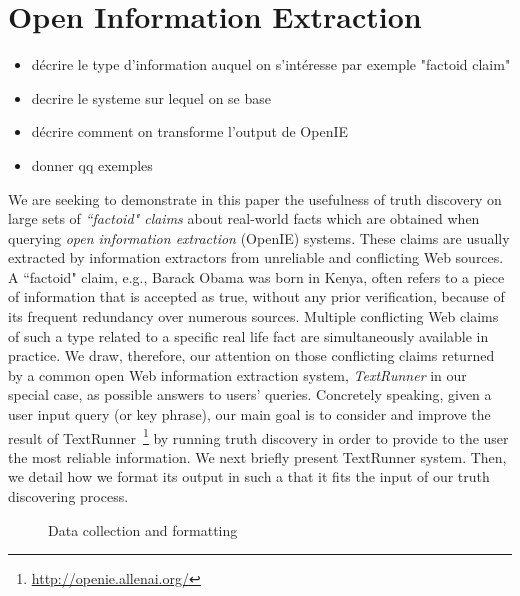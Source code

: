 \section{Open Information Extraction}
\begin{itemize}
 \item décrire le type d'information auquel on s'intéresse par exemple "factoid claim"
 \item decrire le systeme sur lequel on se base
 \item décrire comment on transforme l'output de OpenIE
 \item donner qq exemples
\end{itemize}

\medskip

We are seeking to demonstrate in this paper the usefulness of truth discovery on large sets of 
\emph{``factoid" claims} about real-world facts which are obtained when querying \emph{open information
extraction} (OpenIE) systems. These claims are usually extracted by information extractors from unreliable
and conflicting Web sources.
A ``factoid" claim, e.g.,  \textsf{Barack Obama was born in Kenya}, often refers to a piece of 
information that is accepted as true, without any prior verification, because of its frequent redundancy
over numerous sources. Multiple conflicting Web claims of such a type related to a specific real life fact 
are simultaneously available in practice. We draw, therefore, our attention on those conflicting claims 
returned by a common open Web information extraction system, \emph{TextRunner} in our special case, as possible answers to users' queries. 
Concretely speaking, given a user input query (or key phrase), our main goal is to consider and improve the result of TextRunner~\footnote{\href{http://openie.allenai.o, rg/}{http://openie.allenai.org/}}
by running truth discovery in order to provide to the user the most reliable information.
We next briefly present TextRunner system. Then, we detail how we format its output in such a that
it fits the input of our truth discovering process.


\begin{figure*}[!ht]
\begin{subfigure}[TextRunner Extraction]{Un exemple d'extraction avec TextRunner}
\end{subfigure}
\hfill
\begin{subfigure}[Extracted Triplets]{Un exemple de tripl\'es extraites}
\end{subfigure}
\label{open}\caption{Data collection and formatting}
\end{figure*}

